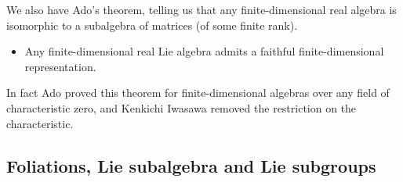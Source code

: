 \documentclass{report}
\theoremstyle{definition}
\begin{document}
We also have Ado's theorem, telling us that any finite-dimensional real algebra is isomorphic to a subalgebra of matrices (of some finite rank).
\begin{itemize}
    \item Any finite-dimensional real Lie algebra admits a faithful finite-dimensional representation. 
\end{itemize}

In fact Ado proved this theorem for finite-dimensional algebras over any field of characteristic zero, and Kenkichi Iwasawa removed the restriction on the characteristic.

\subsection{Foliations, Lie subalgebra and Lie subgroups}
\end{document}
